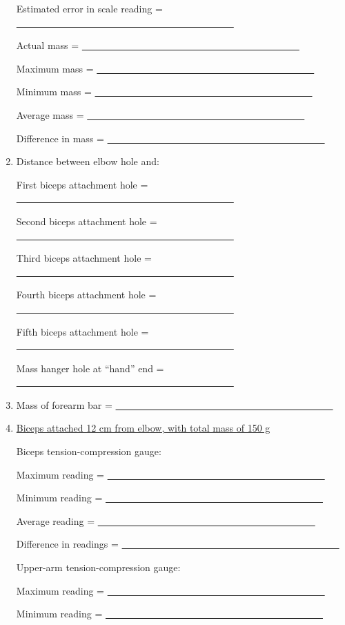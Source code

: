 \begin{enumerate}[label=\arabic*.]
Estimated error in scale reading = \ul{~~~~~~~~~~~~~~~~~~~~~~~~~~~~~~~~~~~~~~~~~~~~~}

Actual mass = \ul{~~~~~~~~~~~~~~~~~~~~~~~~~~~~~~~~~~~~~~~~~~~~~}

Maximum mass = \ul{~~~~~~~~~~~~~~~~~~~~~~~~~~~~~~~~~~~~~~~~~~~~~}

Minimum mass = \ul{~~~~~~~~~~~~~~~~~~~~~~~~~~~~~~~~~~~~~~~~~~~~~}

Average mass = \ul{~~~~~~~~~~~~~~~~~~~~~~~~~~~~~~~~~~~~~~~~~~~~~}

Difference in mass = \ul{~~~~~~~~~~~~~~~~~~~~~~~~~~~~~~~~~~~~~~~~~~~~~}

\item Distance between elbow hole and:

First biceps attachment hole = \ul{~~~~~~~~~~~~~~~~~~~~~~~~~~~~~~~~~~~~~~~~~~~~~}

Second biceps attachment hole = \ul{~~~~~~~~~~~~~~~~~~~~~~~~~~~~~~~~~~~~~~~~~~~~~}

Third biceps attachment hole = \ul{~~~~~~~~~~~~~~~~~~~~~~~~~~~~~~~~~~~~~~~~~~~~~}

Fourth biceps attachment hole = \ul{~~~~~~~~~~~~~~~~~~~~~~~~~~~~~~~~~~~~~~~~~~~~~}

Fifth biceps attachment hole = \ul{~~~~~~~~~~~~~~~~~~~~~~~~~~~~~~~~~~~~~~~~~~~~~}

Mass hanger hole at ``hand'' end = \ul{~~~~~~~~~~~~~~~~~~~~~~~~~~~~~~~~~~~~~~~~~~~~~}

\item Mass of forearm bar = \ul{~~~~~~~~~~~~~~~~~~~~~~~~~~~~~~~~~~~~~~~~~~~~~}

\item \ul{Biceps attached 12 cm from elbow, with total mass of 150 g}

Biceps tension-compression gauge:

Maximum reading = \ul{~~~~~~~~~~~~~~~~~~~~~~~~~~~~~~~~~~~~~~~~~~~~~}

Minimum reading = \ul{~~~~~~~~~~~~~~~~~~~~~~~~~~~~~~~~~~~~~~~~~~~~~}

Average reading = \ul{~~~~~~~~~~~~~~~~~~~~~~~~~~~~~~~~~~~~~~~~~~~~~}

Difference in readings = \ul{~~~~~~~~~~~~~~~~~~~~~~~~~~~~~~~~~~~~~~~~~~~~~}

Upper-arm tension-compression gauge:

Maximum reading = \ul{~~~~~~~~~~~~~~~~~~~~~~~~~~~~~~~~~~~~~~~~~~~~~}

Minimum reading = \ul{~~~~~~~~~~~~~~~~~~~~~~~~~~~~~~~~~~~~~~~~~~~~~}


\end{enumerate}
